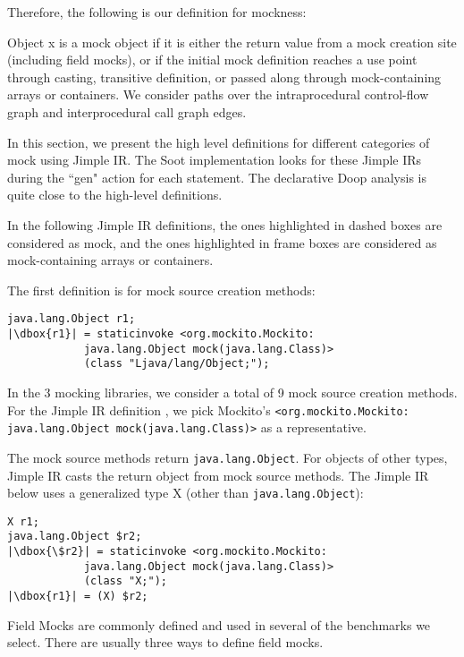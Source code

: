 Therefore, the following is our definition for mockness:

Object x is a mock object if it is either the return value from a mock creation site (including field mocks), or if the initial mock definition reaches a use point through casting, transitive definition, or passed along through mock-containing arrays or containers. We consider paths over the intraprocedural control-flow graph and interprocedural call graph edges.


In this section, we present the high level definitions for different categories of mock using Jimple IR. The Soot implementation looks for these Jimple IRs during the ``gen" action for each statement. The declarative Doop analysis is quite close to the high-level definitions.

In the following Jimple IR definitions, the ones highlighted in dashed boxes are considered as mock, and the ones highlighted in frame boxes are considered as mock-containing arrays or containers.

The first definition is for mock source creation methods: 

\begin{lstlisting}[basicstyle=\linespread{1.0}\ttfamily\small,numbers=none,escapechar={|}]
java.lang.Object r1;
|\dbox{r1}| = staticinvoke <org.mockito.Mockito:
			java.lang.Object mock(java.lang.Class)>
			(class "Ljava/lang/Object;");

\end{lstlisting}

In the 3 mocking libraries, we consider a total of 9 mock source creation methods. For the Jimple IR definition , we pick Mockito's \texttt{<org.mockito.Mockito: java.lang.Object mock(java.lang.Class)>} as a representative.

The mock source methods return \texttt{java.lang.Object}. For objects of other types, Jimple IR casts the return object from mock source methods. The Jimple IR below uses a generalized type X (other than \texttt{java.lang.Object}):

\begin{lstlisting}[basicstyle=\linespread{1.0}\ttfamily\small,numbers=none,escapechar={|}]
X r1;
java.lang.Object $r2;
|\dbox{\$r2}| = staticinvoke <org.mockito.Mockito: 
			java.lang.Object mock(java.lang.Class)>
			(class "X;");
|\dbox{r1}| = (X) $r2;
\end{lstlisting}

Field Mocks are commonly defined and used in several of the benchmarks we select. There are usually three ways to define field mocks. 

